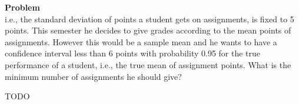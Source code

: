\documentclass[12pt]{article}
\newenvironment{Ex}{\textbf{Problem}\vspace{.75em}\\}{}
\begin{document}
\begin{enumerate}
\begin{Ex}
    i.e., the standard deviation of points a student gets on
    assignments, is fixed to 5 points. This semester he decides to
    give grades according to the mean points of assignments. However
    this would be a sample mean and he wants to have a confidence
    interval less than 6 points with probability 0.95 for the true
    performance of a student, i.e., the true mean of assignment
    points. What is the minimum number of assignments he should give?
    \begin{solution} \hfill
      {\huge \color{red} TODO}
    \end{solution}
  \end{Ex}
\end{enumerate}
\end{document}
